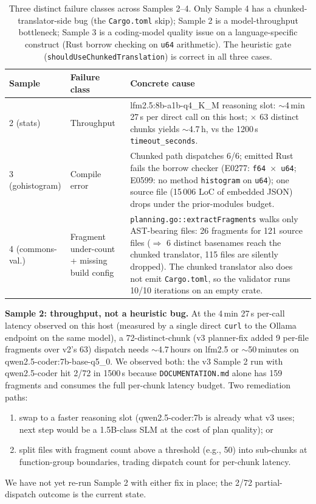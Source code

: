 \begin{table}[ht]
\centering
\small
\begin{tabular}{l l l}
\toprule
Sample & Failure class & Concrete cause \\
\midrule
2 (stats)        & Throughput          & lfm2.5:8b-a1b-q4\_K\_M reasoning slot: $\sim$4\,min 27\,s per direct call on this host; $\times$ 63 distinct chunks yields $\sim$4.7\,h, vs the 1200\,s \texttt{timeout\_seconds}. \\
3 (gohistogram)  & Compile error       & Chunked path dispatches 6/6; emitted Rust fails the borrow checker (E0277: \texttt{f64 $\times$ u64}; E0599: no method \texttt{histogram} on \texttt{u64}); one source file (15\,006 LoC of embedded JSON) drops under the prior-modules budget. \\
4 (commons-val.) & Fragment under-count + missing build config & \texttt{planning.go::extractFragments} walks only AST-bearing files: 26 fragments for 121 source files ($\Rightarrow$ 6 distinct basenames reach the chunked translator, 115 files are silently dropped). The chunked translator also does not emit \texttt{Cargo.toml}, so the validator runs 10/10 iterations on an empty crate. \\
\bottomrule
\end{tabular}
\caption{Three distinct failure classes across Samples 2--4.
Only Sample 4 has a chunked-translator-side bug (the
\texttt{Cargo.toml} skip); Sample 2 is a model-throughput
bottleneck; Sample 3 is a coding-model quality issue on a
language-specific construct (Rust borrow checking on
\texttt{u64} arithmetic). The heuristic gate
(\texttt{shouldUseChunkedTranslation}) is correct in all three
cases.}
\label{tab:failure-modes}
\end{table}

\noindent
\textbf{Sample 2: throughput, not a heuristic bug.}
At the 4\,min 27\,s per-call latency observed on this host
(measured by a single direct \texttt{curl} to the Ollama
endpoint on the same model), a 72-distinct-chunk
(v3 planner-fix added 9 per-file fragments over v2's 63)
dispatch needs $\sim$4.7\,hours on lfm2.5 or $\sim$50\,minutes
on qwen2.5-coder:7b-base-q5\_0. We observed both: the v3 Sample 2
run with qwen2.5-coder hit 2/72 in 1500\,s because
\texttt{DOCUMENTATION.md} alone has 159 fragments and consumes
the full per-chunk latency budget. Two remediation paths:
\begin{enumerate}
\item swap to a faster reasoning slot (qwen2.5-coder:7b is already
      what v3 uses; next step would be a 1.5B-class SLM at the
      cost of plan quality); or
\item split files with fragment count above a threshold (e.g., 50)
      into sub-chunks at function-group boundaries, trading dispatch
      count for per-chunk latency.
\end{enumerate}
We have not yet re-run Sample 2 with either fix in place; the
2/72 partial-dispatch outcome is the current state.

